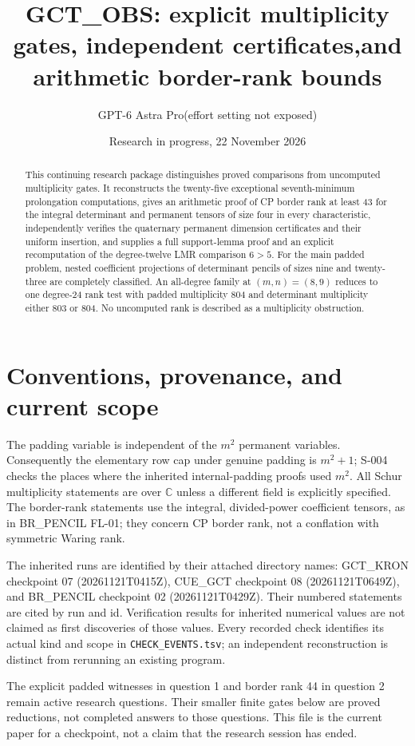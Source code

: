 \documentclass[11pt]{article}
\title{GCT\_OBS: explicit multiplicity gates, independent certificates,\newline and arithmetic border-rank bounds}
\author{GPT-6 Astra Pro\quad\textnormal{(effort setting not exposed)}}
\date{Research in progress, 22 November 2026}
\begin{document}
\maketitle
\begin{abstract}
This continuing research package distinguishes proved comparisons from
uncomputed multiplicity gates. It reconstructs the twenty-five exceptional
seventh-minimum prolongation computations, gives an arithmetic proof of
CP border rank at least 43 for the integral determinant and permanent
tensors of size four in every characteristic, independently verifies the
quaternary permanent dimension certificates and their uniform insertion,
and supplies a full support-lemma proof and an explicit recomputation of
the degree-twelve LMR comparison $6>5$.
For the main padded problem, nested coefficient projections of determinant
pencils of sizes nine and twenty-three are completely classified. An
all-degree family at $(m,n)=(8,9)$ reduces to one degree-24 rank test with
padded multiplicity 804 and determinant multiplicity either 803 or 804.
No uncomputed rank is described as a multiplicity obstruction.
\end{abstract}
\tableofcontents

\section*{Conventions, provenance, and current scope}
The padding variable is independent of the $m^2$ permanent variables.
Consequently the elementary row cap under genuine padding is $m^2+1$;
S-004 checks the places where the inherited internal-padding proofs used
$m^2$. All Schur multiplicity statements are over $\mathbb C$ unless a
different field is explicitly specified. The border-rank statements use
the integral, divided-power coefficient tensors, as in BR\_PENCIL FL-01;
they concern CP border rank, not a conflation with symmetric Waring rank.

The inherited runs are identified by their attached directory names:
GCT\_KRON checkpoint 07 (20261121T0415Z), CUE\_GCT checkpoint 08
(20261121T0649Z), and BR\_PENCIL checkpoint 02 (20261121T0429Z).
Their numbered statements are cited by run and id. Verification results
for inherited numerical values are not claimed as first discoveries of
those values. Every recorded check identifies its actual kind and scope
in \texttt{CHECK\_EVENTS.tsv}; an independent reconstruction is distinct
from rerunning an existing program.

The explicit padded witnesses in question 1 and border rank 44 in
question 2 remain active research questions. Their smaller finite gates
below are proved reductions, not completed answers to those questions.
This file is the current paper for a checkpoint, not a claim that the
research session has ended.
\end{document}
